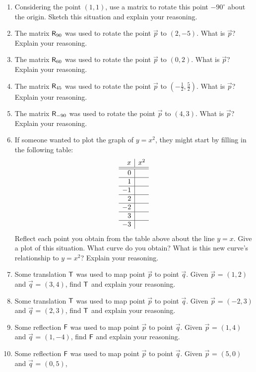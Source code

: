 \begin{problems}
\begin{enumerate}
\item Considering the point $(1,1)$, use a matrix to rotate this point
  $-90^\circ$ about the origin.  Sketch this situation and explain your
  reasoning.  
\item The matrix $\mathsf{R}_{90}$ was used to rotate the point $\vec{p}$
  to $(2,-5)$.  What is $\vec{p}$? Explain your reasoning.
\item The matrix $\mathsf{R}_{60}$ was used to rotate the point $\vec{p}$
  to $(0,2)$.  What is $\vec{p}$? Explain your reasoning.
\item The matrix $\mathsf{R}_{45}$ was used to rotate the point $\vec{p}$
  to $(-\frac{1}{2}, \frac{5}{2})$.  What is $\vec{p}$? Explain your reasoning.
\item The matrix $\mathsf{R}_{-90}$ was used to rotate the point $\vec{p}$
  to $(4,3)$.  What is $\vec{p}$? Explain your reasoning.
\item If someone wanted to plot the graph of $y=x^2$, they might start
  by filling in the following table:
\[
\begin{array}{r | c}
 x & x^2 \\
\hline\hline
0  & \\\hline
1  & \\\hline
-1 & \\\hline
2  & \\\hline
-2 & \\\hline
3  & \\\hline
-3 & 
\end{array}
\]
Reflect each point you obtain from the table above about the line
$y=x$. Give a plot of this situation. What curve do you obtain? What
is this new curve's relationship to $y=x^2$? Explain your reasoning.
\item Some translation $\mathsf{T}$ was used to map point $\vec{p}$ to
  point $\vec{q}$.  Given $\vec{p}$ = $(1,2)$ and $\vec{q}$ = $(3,4)$,
  find $\mathsf{T}$ and explain your reasoning.
\item Some translation $\mathsf{T}$ was used to map point $\vec{p}$ to
  point $\vec{q}$.  Given $\vec{p}$ = $(-2,3)$ and $\vec{q}$ =
  $(2,3)$, find $\mathsf{T}$ and explain your reasoning.
\item Some reflection $\mathsf{F}$ was used to map point $\vec{p}$ to
  point $\vec{q}$.  Given $\vec{p}$ = $(1,4)$ and $\vec{q}$ =
  $(1,-4)$, find $\mathsf{F}$ and explain your reasoning.
\item Some reflection $\mathsf{F}$ was used to map point $\vec{p}$ to
  point $\vec{q}$.  Given $\vec{p}$ = $(5,0)$ and $\vec{q}$ = $(0,5)$,

\end{enumerate}
\end{problems}
